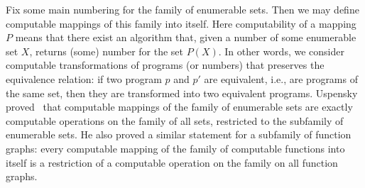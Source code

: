 \documentclass[12pt]{article}
\theoremstyle{remark}
\begin{document}
Fix some main numbering for the family of enumerable sets. Then we may define computable mappings of this family into itself. Here computability of a mapping $P$ means that there exist an algorithm that, given a number of some enumerable set $X$, returns (some) number for the set $P(X)$. In other words, we consider computable transformations of programs (or numbers) that preserves the equivalence relation: if two program $p$ and $p'$ are equivalent, i.e., are programs of the same set, then they are transformed into two equivalent programs. Uspensky proved~\cite[Section 6]{1955a} that computable mappings of the family of enumerable sets are exactly computable operations on the family of all sets, restricted to the subfamily of enumerable sets. He also proved a similar statement for a subfamily of function graphs: every computable mapping of the family of computable functions into itself is a restriction of a computable operation on the family on all function graphs. 
\end{document}
